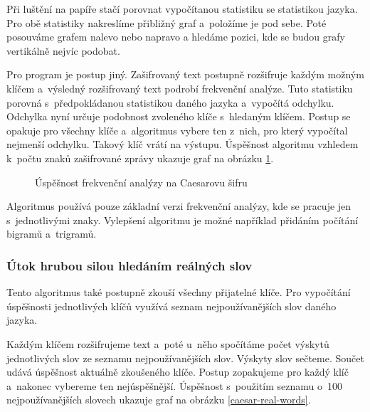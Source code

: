 \documentclass[glossaries, index]{kidiplom}
\begin{document}
Při luštění na papíře stačí porovnat vypočítanou statistiku se statistikou jazyka. Pro obě statistiky nakreslíme přibližný graf a~položíme je pod sebe. Poté posouváme grafem nalevo nebo napravo a hledáme pozici, kde se budou grafy vertikálně nejvíc podobat. 

Pro program je postup jiný. Zašifrovaný text postupně rozšifruje každým možným klíčem a~výsledný rozšifrovaný text podrobí frekvenční analýze. Tuto statistiku porovná s~předpokládanou statistikou daného jazyka a~vypočítá odchylku. Odchylka nyní určuje podobnost zvoleného klíče s~hledaným klíčem. Postup se opakuje pro všechny klíče a~algoritmus vybere ten z~nich, pro který vypočítal nejmenší odchylku. Takový klíč vrátí na výstupu. Úspěšnost algoritmu vzhledem k~počtu znaků zašifrované zprávy ukazuje graf na obrázku \ref{caesar-frequency-analysis}.

\begin{figure}[htbp]
\centering
{}
\caption{Úspěšnost frekvenční analýzy na Caesarovu šifru}
\label{caesar-frequency-analysis}
\end{figure}

Algoritmus používá pouze základní verzi frekvenční analýzy, kde se pracuje jen s~jednotlivými znaky. Vylepšení algoritmu je možné například přidáním počítání bigramů a~trigramů.

\subsubsection{Útok hrubou silou hledáním reálných slov}
Tento algoritmus také postupně zkouší všechny přijatelné klíče. Pro vypočítání úspěšnosti jednotlivých klíčů využívá seznam nejpoužívanějších slov daného jazyka. 

Každým klíčem rozšifrujeme text a~poté u~něho spočítáme počet výskytů jednotlivých slov ze seznamu nejpoužívanějších slov. Výskyty slov sečteme. Součet udává úspěšnost aktuálně zkoušeného klíče. Postup zopakujeme pro každý klíč a~nakonec vybereme ten nejúspěšnější. Úspěšnost s~použitím seznamu o~100 nejpoužívanějších slovech ukazuje graf na obrázku \ref{caesar-real-words}. 
\end{document}
